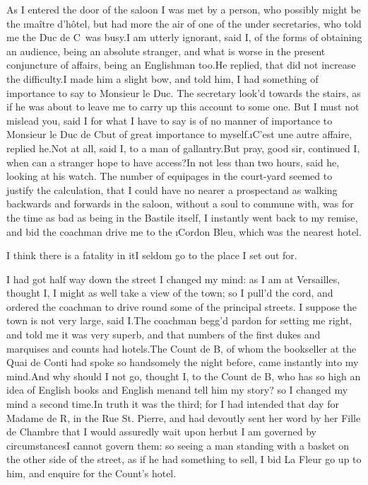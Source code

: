 \documentclass[twoside]{article}
\begin{document}
As I entered the door of the saloon I was
met by a person, who possibly might be the
\i{maître d’hôtel}, but had more the air
of one of the under secretaries, who told
me the Duc de C\anon\ was busy.\tskk I am
utterly ignorant, said I, of the forms of
obtaining an audience, being an absolute
stranger, and what is worse in the present
conjuncture of affairs, being an
Englishman too.\tskk He replied, that did
not increase the difficulty.\tskk I made
him a slight bow, and told him, I had
something of importance to say to Monsieur
le Duc.  The secretary look’d towards the
stairs, as if he was about to leave me to
carry up this account to some one.\tskk
But I must not mislead you, said I\tskk
for what I have to say is of no manner of
importance to Monsieur le Duc de
C\anon\tskk but of great importance to
myself.\tskk \i{C’est une autre affaire},
replied he.\tskk Not at all, said I, to a
man of gallantry.\tskk But pray, good sir,
continued I, when can a stranger hope to
have access?\tskk In not less than two
hours, said he, looking at his watch.  The
number of equipages in the court-yard
seemed to justify the calculation, that I
could have no nearer a prospect\tskk and
as walking backwards and forwards in the
saloon, without a soul to commune with,
was for the time as bad as being in the
Bastile itself, I instantly went back to
my remise, and bid the coachman drive me
to the \i{Cordon Bleu}, which was the
nearest hotel.

I think there is a fatality in it\tskk I
seldom go to the place I set out for.





\vskip 6pt


 I had got half way down
the street I changed my mind: as I am at
Versailles, thought I, I might as well
take a view of the town; so I pull’d the
cord, and ordered the coachman to drive
round some of the principal streets.\tskk
I suppose the town is not very large, said
I.\tskk The coachman begg’d pardon for
setting me right, and told me it was very
superb, and that numbers of the first
dukes and marquises and counts had
hotels.\tskk The Count de B\anon, of whom
the bookseller at the Quai de Conti had
spoke so handsomely the night before, came
instantly into my mind.\tskk And why
should I not go, thought I, to the Count
de B\anon, who has so high an idea of
English books and English men\tskk and
tell him my story? so I changed my mind a
second time.\tskk In truth it was the
third; for I had intended that day for
Madame de R\tskk , in the Rue St. Pierre,
and had devoutly sent her word by her
Fille de Chambre that I would
assuredly wait upon her\tskk but I am
governed by circumstances\tskk I cannot
govern them: so seeing a man standing with
a basket on the other side of the street,
as if he had something to sell, I bid La
Fleur go up to him, and enquire for the
Count’s hotel.
\end{document}
